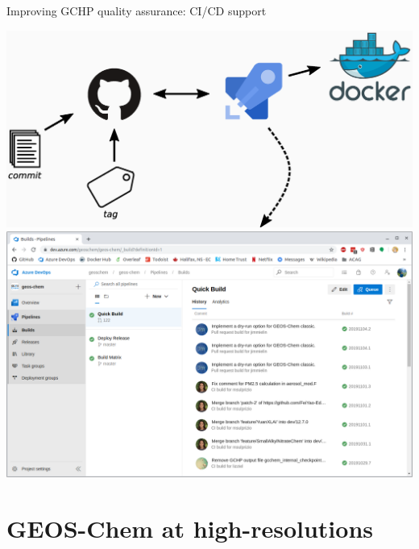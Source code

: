 \documentclass[10pt]{beamer}
\begin{document}
\begin{frame}[fragile]{Improving GCHP quality assurance: CI/CD support}
    \begin{center}
        \includegraphics[height=0.3\textheight]{pipeline.eps}
        \vfill
        \includegraphics[height=0.5\textheight]{CI.png}
    \end{center}
\end{frame}

\section{GEOS-Chem at high-resolutions}
\end{document}
